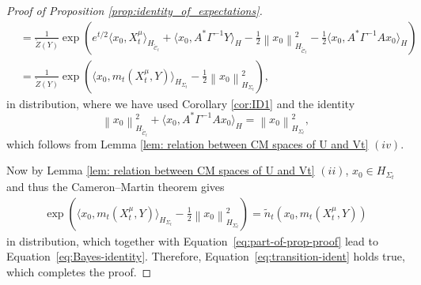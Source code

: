 \documentclass[10pt]{article} %
\def\Eqref#1{Equation~\ref{#1}}
\theoremstyle{plain}
\theoremstyle{definition}
\theoremstyle{remark}
\newcommand{\norm}[1]{\left\|#1\right\|}
\newcommand{\C}{\mathcal C}
\begin{document}
\begin{proof}[Proof of Proposition \ref{prop:identity_of_expectations}]
\begin{equation}
\begin{aligned}
    &=  \frac{1}{\widetilde{Z}(Y)}\exp\left( e^{t/2} \langle x_0, X_t^\mu \rangle_{H_{\widetilde{\C}_t}} + \langle x_0, A^* \Gamma^{-1} Y \rangle_H - \frac{1}{2}\norm{x_0}_{H_{\widetilde{\C}_t}}^2 -\frac{1}{2} \langle x_0, A^* \Gamma^{-1} A x_0 \rangle_H \right) \\ 
    &= \frac{1}{\widetilde{Z}(Y)}\exp\left( \langle x_0, m_t(X_t^\mu,Y) \rangle_{H_{\Sigma_t}} - \frac{1}{2} \norm{x_0}_{H_{\Sigma_t}}^2\right),
    \end{aligned}
    \end{equation}
    in distribution, where we have used Corollary \ref{cor:ID1} and the identity
    \begin{equation}\label{eq:ID2}
        \norm{x_0}_{H_{\widetilde{\C}_t}}^2 + \langle x_0, A^*\Gamma^{-1}Ax_0 \rangle_{H} = \norm{x_0}_{H_{\Sigma_t}}^2,
    \end{equation}
    which follows from Lemma \ref{lem: relation between CM spaces of U and Vt} $(iv)$.
    
    Now by Lemma \ref{lem: relation between CM spaces of U and Vt} $(ii)$, $x_0\in H_{\Sigma_t}$ and thus the Cameron--Martin theorem gives
    \begin{eqnarray*}
        \exp\left( \langle x_0, m_t(X_t^\mu,Y) \rangle_{H_{\Sigma_t}} - \frac{1}{2}\norm{x_0}^2_{H_{\Sigma_t}} \right) = \tilde{n}_t(x_0, m_t(X_t^\mu,Y))
    \end{eqnarray*}
    in distribution,     which together with \Eqref{eq:part-of-prop-proof} lead to \Eqref{eq:Bayes-identity}. Therefore, \Eqref{eq:transition-ident} holds true, which completes the proof.
\end{proof}
\end{document}

